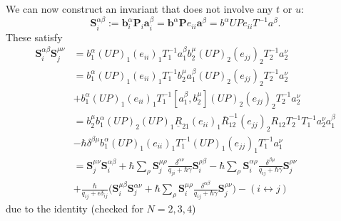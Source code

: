 \documentclass[11pt]{report}
\theoremstyle{definition}
\theoremstyle{remark}
\theoremstyle{remark}
\begin{document}
We can now construct an invariant that does not involve any $t$ or $u$:
\begin{equation*}
\mathbf{S}_i^{\alpha\beta} := \mathbf{b}_i^\alpha \mathbf{P}_i \mathbf{a}_i^\beta = \mathbf{b}^\alpha \mathbf{P} e_{ii} \mathbf{a}^\beta = b^\alpha U P e_{ii} T^{-1} a^\beta.
\end{equation*}
These satisfy
\begin{align}
\mathbf{S}_i^{\alpha\beta} \mathbf{S}_j^{\mu\nu}
&= b_1^\alpha (UP)_1 (e_{ii})_1 T_1^{-1} a_1^\beta b_2^\mu (UP)_2 (e_{jj})_2 T_2^{-1} a_2^\nu \\
&= b_1^\alpha (UP)_1 (e_{ii})_1 T_1^{-1} b_2^\mu a_1^\beta (UP)_2 (e_{jj})_2 T_2^{-1} a_2^\nu \\
&+ b_1^\alpha (UP)_1 (e_{ii})_1 T_1^{-1} [a_1^\beta ,b_2^\mu] (UP)_2 (e_{jj})_2 T_2^{-1} a_2^\nu \\
&= b_2^\mu b_1^\alpha (UP)_2 (UP)_1 \underline{R}_{21} (e_{ii})_1 \bar R_{12}^{-1} (e_{jj})_2 R_{12} T_2^{-1} T_1^{-1} a_2^\nu a_1^\beta \\
&- \hbar \delta^{\beta\mu} b_1^\alpha (UP)_1 (e_{ii})_1 T_1^{-1} (UP)_1 (e_{jj})_1 T_1^{-1} a_1^\nu \\
&= \mathbf{S}_j^{\mu\nu} \mathbf{S}_i^{\alpha\beta}  + \hbar \sum_\rho \mathbf{S}_j^{\mu\rho} \frac{\delta^{\alpha\nu}}{q_{ji}+\hbar\gamma} \mathbf{S}_i^{\rho\beta} - \hbar \sum_\rho \mathbf{S}_i^{\alpha\rho} \frac{\delta^{\beta\mu}}{q_{ij}+\hbar\gamma} \mathbf{S}_j^{\rho\nu} \label{equation:SSfirstline} \\
&+ \frac{\hbar}{q_{ij}+\epsilon\delta_{ij}} \bigg( \mathbf{S}_i^{\mu\beta} \mathbf{S}_j^{\alpha\nu} + \hbar \sum_\rho \mathbf{S}_i^{\mu\rho} \frac{\delta^{\alpha\beta}}{q_{ij}+\hbar\gamma} \mathbf{S}_j^{\rho\nu} \bigg) - (i \leftrightarrow j)
\label{equation:SSsecondline}
\end{align}
due to the identity (checked for $N=2,3,4$)
\end{document}
